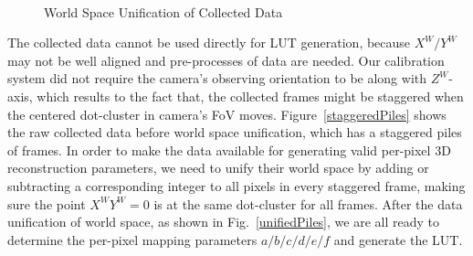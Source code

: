 \\\indent
%
 \begin{figure}[t]
\hspace*{-0.5cm}
\centering
{}
{}
%
\caption{World Space Unification of Collected Data}
\label{worldSpaceDataUnification}
\end{figure}
%
The collected data cannot be used directly for LUT generation, because \(X^W/Y^W\) may not be well aligned and pre-processes of data are needed. Our calibration system did not require the camera's observing orientation to be along with \(Z^W\)-axis, which results to the fact that, the collected frames might be staggered when the centered dot-cluster in camera's FoV moves. Figure~\ref{staggeredPiles} shows the raw collected data before world space unification, which has a staggered piles of frames. In order to make the data available for generating valid per-pixel 3D reconstruction parameters, we need to unify their world space by adding or subtracting a corresponding integer to all pixels in every staggered frame, making sure the point \(X^WY^W = 0\) is at the same dot-cluster for all frames.	After the data unification of world space, as shown in Fig.~\ref{unifiedPiles}, we are all ready to determine the per-pixel mapping parameters \(a/b/c/d/e/f\) and generate the LUT.
%
